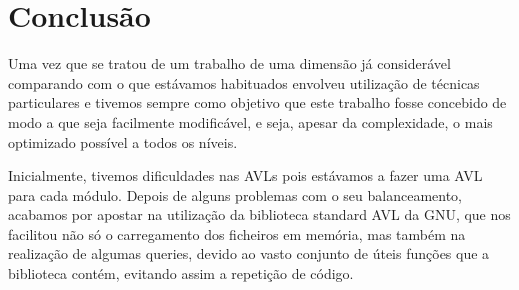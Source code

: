 \chapter{Conclusão}

Uma vez que se tratou de um trabalho de uma dimensão já considerável comparando com o que estávamos habituados envolveu utilização de técnicas particulares e tivemos sempre como objetivo que este trabalho fosse concebido de modo a que seja facilmente modificável, e seja, apesar da complexidade, o mais optimizado possível a todos os níveis.

Inicialmente, tivemos dificuldades nas AVLs pois estávamos a fazer uma AVL para cada módulo. Depois de alguns problemas com o seu balanceamento, acabamos por apostar na utilização da biblioteca standard AVL da GNU, que nos facilitou não só o carregamento dos ficheiros em memória, mas também na realização de algumas queries, devido ao vasto conjunto de úteis funções que a biblioteca contém, evitando assim a repetição de código. 

